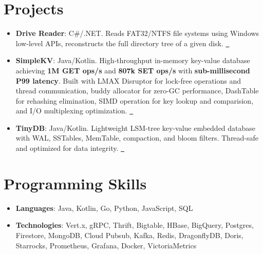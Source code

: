 \documentclass[letterpaper,11pt]{article}
\newcommand{\resumeItem}[2]{
    \item\small{
        \textbf{#1}{: #2 \vspace{-2pt}}
    }
}
\newcommand{\resumeSubItem}[2]{\resumeItem{#1}{#2}\vspace{-4pt}}
\newcommand{\resumeSubHeadingListStart}{\begin{itemize}[leftmargin=*]}
\newcommand{\resumeSubHeadingListEnd}{\end{itemize}}
\begin{document}
    \section{Projects}\label{sec:projects}
    \resumeSubHeadingListStart
    \resumeSubItem{Drive Reader}{C\#/.NET. Reads FAT32/NTFS file systems using Windows low-level APIs, reconstructs the full directory tree of a given disk. \href{https://github.com/phuchienngo/DriveReader}{\faGithub\ }}
    \resumeSubItem{SimpleKV}{Java/Kotlin. High-throughput in-memory key-value database achieving \textbf{1M GET ops/s} and \textbf{807k SET ops/s} with \textbf{sub-millisecond P99 latency}. Built with LMAX Disruptor for lock-free operations and thread communication, buddy allocator for zero-GC performance, DashTable for rehashing elimination, SIMD operation for key lookup and comparision, and I/O multiplexing optimization. \href{https://github.com/phuchienngo/simplekv}{\faGithub\ }}
    \resumeSubItem{TinyDB}{Java/Kotlin. Lightweight LSM-tree key-value embedded database with WAL, SSTables, MemTable, compaction, and bloom filters. Thread-safe and optimized for data integrity. \href{https://github.com/phuchienngo/tinydb}{\faGithub\ }}
    \resumeSubHeadingListEnd

%
    \section{Programming Skills}\label{sec:programming-skills}
    \resumeSubHeadingListStart
    \resumeSubItem{Languages}
    {Java, Kotlin, Go, Python, JavaScript, SQL}
    \resumeSubItem{Technologies}
    {Vert.x, gRPC, Thrift, Bigtable, HBase, BigQuery, Postgres, Firestore, MongoDB, Cloud Pubsub, Kafka, Redis, DragonflyDB, Doris, Starrocks, Prometheus, Grafana, Docker, VictoriaMetrics}
    \resumeSubHeadingListEnd


\end{document}

